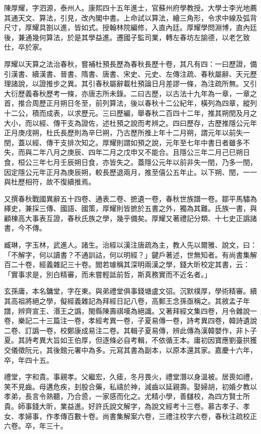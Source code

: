 \begin{pinyinscope}
陳厚耀，字泗源，泰州人。康熙四十五年進士，官蘇州府學教授。大學士李光地薦其通天文、算法，引見，改內閣中書。上命試以算法，繪三角形，令求中線及弧背尺寸，厚耀具劄以進，皆如式。授翰林院編修，入直內廷。厚耀學問淵博，直內廷後，兼通幾何算法，於是其學益進。遷國子監司業，轉左春坊左諭德，以老乞致仕，卒於家。

厚耀以天算之法治春秋，嘗補杜預長歷為春秋長歷十卷，其凡有四：一曰歷證，備引漢書、續漢書、晉書、隋書、唐書、宋史、元史、左傳注疏、春秋屬辭、天元歷理諸說，以證推步之異。其引春秋屬辭載杜預論日月差謬一條，為注疏所無。又引大衍歷義春秋歷考一條，亦唐志所未錄。二曰古歷，以古法十九年為一章，一章之首，推合周歷正月朔日冬至，前列算法，後以春秋十二公紀年，橫列為四章，縱列十二公，積而成表，以求歷元。三曰歷編，舉春秋二百四十二年，推其朔閏及月之大小，而以經、傳干支為證佐，述杜預之說而考辨之。四曰歷存，古歷推隱公元年正月庚戌朔，杜氏長歷則為辛巳朔，乃古歷所推上年十二月朔，謂元年以前失一閏，蓋以經、傳干支排次知之。厚耀則謂如預之說，元年至七年中書日者雖多不失，而與二年八月之庚辰、四年二月之戊申又不能合。且隱公三年二月己巳朔日食，桓公三年七月壬辰朔日食，亦皆失之。蓋隱公元年以前非失一閏，乃多一閏，因定隱公元年正月為庚辰朔，較長歷退兩月，推至僖公五年止。以下朔、閏，一一與杜歷相符，故不復續推焉。

又撰春秋戰國異辭五十四卷、通表二卷、摭遺一卷，春秋世族譜一卷。鄒平馬驌為繹史，兼採三傳、國語、國策，厚耀則皆摭於五書之外，獨為其難。氏族一書，與顧棟高大事表互證，春秋氏族之學，幾乎備矣。厚耀又著禮記分類、十七史正譌諸書，今不傳。

臧琳，字玉林，武進人。諸生。治經以漢注唐疏為主，教人先以爾雅、說文，曰：「不解字，何以讀書？不通訓詁，何以明經？」鍵戶著述，世無知者。有尚書集解百二十卷，經義雜記三十卷。閻若璩稱其深明兩漢之學，錢大昕校定其書，云：「實事求是，別白精審，而未嘗輕詆前哲，斯真務實而不近名者。」

玄孫庸，本名鏞堂，字在東。與弟禮堂俱事錢塘盧文弨。沉默樸厚，學術精審。續其高祖將絕之學，儗經義雜記為拜經日記八卷，高郵王念孫亟稱之。其敘孟子年譜，辨齊宣王、湣王之譌，閩縣陳壽祺嘆為絕識。又著拜經文集四卷，月令雜說一卷，樂記二十三篇注一卷，孝經考異一卷，子夏易傳一卷，詩考異四卷，韓詩遺說二卷、訂譌一卷，校鄭康成易注二卷。其輯子夏易傳，辨此傳為漢韓嬰作，非卜子夏。其詩考異大旨如王伯厚，但逐條必自考輯，不依循王本。庸初因寶應劉臺拱獲交儀徵阮元，其後館元署中為多。元寫其書為副本，以原本還其家。嘉慶十六年，卒，年四十五。

禮堂，字和貴。事親孝。父繼宏，久瘧，冬月畏火，禮堂潛以身溫被。居喪如禮，笑不見齒。母遘危疾，刲股合藥，私禱於神，減齒以延親壽。娶婦胡，初婚夕教以孝弟，長言令熟聽，乃合巹，一家感而化之。尤精小學，善讎校，為四方賢士所貴。師事錢大昕，業益進。好許氏說文解字，為說文經考十三卷。慕古孝子、孝女、孝婦事，作孝傳百數十卷。尚書集解案六卷，三禮注校字六卷，春秋注疏校正六卷。卒，年三十。


\end{pinyinscope}
